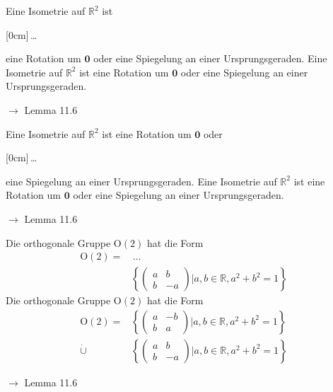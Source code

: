 \documentclass[11pt]{article}
\renewcommand{\cite}[1]{\par\bigskip\hfill{\color{gray}\tiny\(\to\) #1}}
\newcommand{\RR}{\mathbb{R}}
\renewcommand{\vec}[1]{\mathbf{#1}}
\newcommand{\hide}[1]{\parbox{0cm}{\raisebox{-7pt}[0cm]{\dots}}\color{white}#1\color{black}}
\let\olddots\dots
\renewcommand{\dots}{\,\olddots\,}
\newenvironment{field}{}{\newpage}
\newif\ifnote
\newenvironment{note}{\notetrue}{\notefalse}
\newcommand{\uuid}{}
\newcommand{\xplain}[1]{\renewcommand{\uuid}{#1}}
\begin{document}
\begin{note}
    \xplain{ac148780-c30d-11ec-9d64-0242ac120002}
    \begin{field}
        Eine Isometrie auf \(\RR^2\) ist \hide{eine Rotation um \(\vec{0}\)} oder eine Spiegelung an einer Ursprungsgeraden.
    \end{field}
    \begin{field}
        Eine Isometrie auf \(\RR^2\) ist eine Rotation um \(\vec{0}\) oder eine Spiegelung an einer Ursprungsgeraden.
        \cite{Lemma 11.6}
    \end{field}

    \begin{field}
        Eine Isometrie auf \(\RR^2\) ist eine Rotation um \(\vec{0}\) oder \hide{eine Spiegelung an einer Ursprungsgeraden}.
    \end{field}
    \begin{field}
        Eine Isometrie auf \(\RR^2\) ist eine Rotation um \(\vec{0}\) oder eine Spiegelung an einer Ursprungsgeraden.
        \cite{Lemma 11.6}
    \end{field}

    \begin{field}
        Die orthogonale Gruppe \(\text{O}(2)\) hat die Form
        \begin{align*}
            \text{O}(2) = &\dots\\
            \phantom{\dot\cup} &\left\{\left(\begin{smallmatrix}
                              a & b\\ b & -a
                          \end{smallmatrix}\right) \vert a,b\in \RR, a^2+b^2=1\right\}
        \end{align*}
    \end{field}
    \begin{field}
        Die orthogonale Gruppe \(\text{O}(2)\) hat die Form
        \begin{align*}
            \text{O}(2) = &\left\{\left(\begin{smallmatrix}
                                  a & -b\\ b & a
                                \end{smallmatrix}\right) \vert a,b\in \RR, a^2+b^2=1\right\}\\
            \dot\cup &\left\{\left(\begin{smallmatrix}
                              a & b\\ b & -a
                            \end{smallmatrix}\right) \vert a,b\in \RR, a^2+b^2=1\right\}
        \end{align*}
        \cite{Lemma 11.6}
    \end{field}


\end{note}
\end{document}
